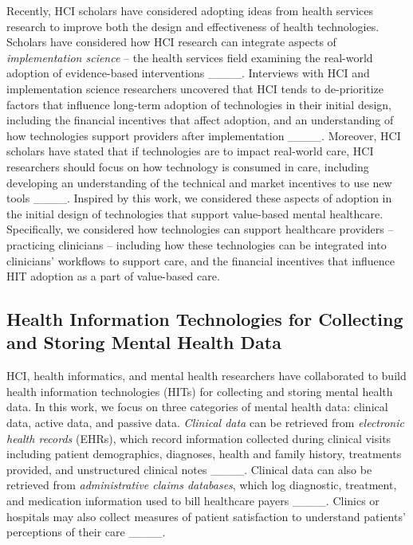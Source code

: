 Recently, HCI scholars have considered adopting ideas from health services research to improve both the design and effectiveness of health technologies.
Scholars have considered how HCI research can integrate aspects of \textit{implementation science} -- the health services field examining the real-world adoption of evidence-based interventions ____. 
Interviews with HCI and implementation science researchers uncovered that HCI tends to de-prioritize factors that influence long-term adoption of technologies in their initial design, including the financial incentives that affect adoption, and an understanding of how technologies support providers after implementation ____.
Moreover, HCI scholars have stated that if technologies are to impact real-world care, HCI researchers should focus on how technology is consumed in care, including developing an understanding of the technical and market incentives to use new tools ____.
Inspired by this work, we considered these aspects of adoption in the initial design of technologies that support value-based mental healthcare.
Specifically, we considered how technologies can support healthcare providers -- practicing clinicians -- including how these technologies can be integrated into clinicians' workflows to support care, and the financial incentives that influence HIT adoption as a part of value-based care.

\subsection{Health Information Technologies for Collecting and Storing Mental Health Data}
\label{sec:rw:data}

HCI, health informatics, and mental health researchers have collaborated to build health information technologies (HITs) for collecting and storing mental health data.
In this work, we focus on three categories of mental health data: clinical data, active data, and passive data.
\textit{Clinical data} can be retrieved from \textit{electronic health records} (EHRs), which record information collected during clinical visits including patient demographics, diagnoses, health and family history, treatments provided, and unstructured clinical notes ____.
Clinical data can also be retrieved from \textit{administrative claims databases}, which log diagnostic, treatment, and medication information used to bill healthcare payers ____.
Clinics or hospitals may also collect measures of patient satisfaction to understand patients' perceptions of their care ____.

